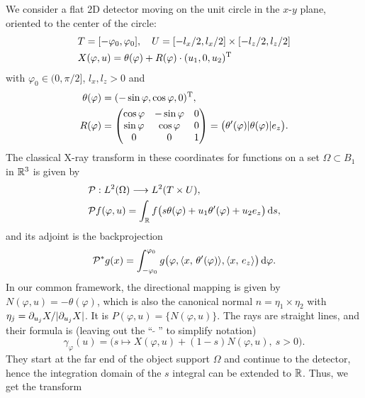 \documentclass{amsart}
\renewcommand*{\phi}{\varphi}
\begin{document}
\begin{example}
 We consider a flat 2D detector moving on the unit circle in the $x$-$y$ plane, oriented to the center of the circle:
 \begin{align*}
  & T = [-\phi_0, \phi_0],\quad U = [-l_x/2, l_x/2] \times [-l_z/2, l_z/2] \\
  & X(\phi, u) = \theta(\phi) + R(\phi) \cdot \TRANSP{(u_1, 0, u_2)}
 \end{align*}
 with $\phi_0 \in (0, \pi/2]$, $l_x, l_z > 0$ and
 \begin{align}
  \theta(\phi) &= \TRANSP{(-\sin\phi, \cos\phi, 0)}, \\ 
  R(\phi) &=
  \begin{pmatrix}
   \cos\phi & -\sin\phi & 0 \\
   \sin\phi & \cos\phi & 0 \\
   0 & 0 & 1
  \end{pmatrix}
  = \big(\theta'(\phi) | \theta(\phi) | e_z\big).
 \end{align}
 The classical X-ray transform in these coordinates for functions on a set $\Omega \subset B_1$ in ${\mathbb{R}}^3$ is given by
 \begin{align}
  &\OPP: L^2(\Omega) \Lto L^2(T \times U), \notag \\
  \label{eq:parallel_fwdproj}
  &\OPP f(\phi, u) = \int_\RR f\big(s\theta(\phi) + u_1 \theta'(\phi) + u_2 e_z\big)\, \D s,
 \end{align}
 and its adjoint is the backprojection
 \begin{equation}
  \label{eq:parallel_backproj}
  \DUALOPP g(x) = \int_{-\phi_0}^{\phi_0} g\big(\phi, \INNER{x}{\theta'(\phi)}, \INNER{x}{e_z}\big)\, \D \phi.
 \end{equation}
 In our common framework, the directional mapping is given by $N(\phi, u) = -\theta(\phi)$, which is also the canonical normal 
 $n = \eta_1 \times \eta_2$ with $\eta_j = \partial_{u_j} X / |\partial_{u_j} X|$. It is $P(\phi, u) = \lbrace N(\phi, u)\rbrace$.
 The rays are straight lines, and their formula is (leaving out the ``$\,\widetilde{\ }\,$'' to simplify notation)
 \begin{equation*}
  \gamma_\phi(u) = \big( s \mapsto X(\phi, u) + (1-s) N(\phi, u),\ s > 0 \big).
 \end{equation*}
 They start at the far end of the object support $\Omega$ and continue to the detector, hence the integration domain of the $s$ 
 integral can be extended to ${\mathbb{R}}$. Thus, we get the transform

\end{example}
\end{document}

